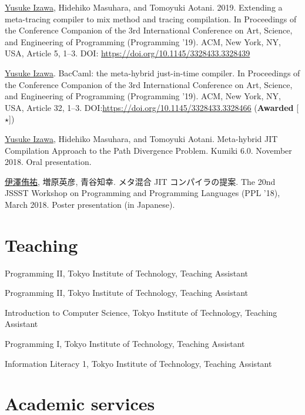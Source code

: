 \documentclass[11pt]{article} %
\newcommand{\YusukeIzawa}{\underline{Yusuke Izawa}}
\newcommand{\伊澤侑祐}{\underline{伊澤侑祐}}
\newcommand{\jit}{\textsc{JIT} }
\begin{document}
 \YusukeIzawa, Hidehiko Masuhara, and Tomoyuki
Aotani. 2019. Extending a meta-tracing compiler to mix method and tracing
compilation. In Proceedings of the Conference Companion of the 3rd International
Conference on Art, Science, and Engineering of Programming (Programming
’19). ACM, New York, NY, USA, Article 5, 1–3. DOI:
\url{https://doi.org/10.1145/3328433.3328439}
\medskip

 \YusukeIzawa. BacCaml: the meta-hybrid just-in-time compiler. In
Proceedings of the Conference Companion of the 3rd International Conference on
Art, Science, and Engineering of Programming (Programming ’19). ACM, New York,
NY, USA, Article 32, 1–3. DOI:\url{https://doi.org/10.1145/3328433.3328466}
(\textbf{Awarded} [$\star$])

\medskip

 \YusukeIzawa, Hidehiko Masuhara, and Tomoyuki Aotani.  Meta-hybrid
\jit Compilation Approach to the Path Divergence Problem. Kumiki 6.0. November
2018. Oral presentation.
\medskip

 \伊澤侑祐, 増原英彦, 青谷知幸. メタ混合 \jit コンパイラの提案. The
20nd JSSST Workshop on Programming and Programming Languages (PPL '18), March
2018. Poster presentation (in Japanese).
\medskip


\section*{Teaching}

 Programming II, Tokyo Institute of Technology, Teaching Assistant

 Programming II, Tokyo Institute of Technology, Teaching Assistant

 Introduction to Computer Science, Tokyo Institute of Technology, Teaching Assistant

 Programming I, Tokyo Institute of Technology, Teaching Assistant

 Information Literacy 1, Tokyo Institute of Technology, Teaching Assistant


\section*{Academic services}
\end{document}
